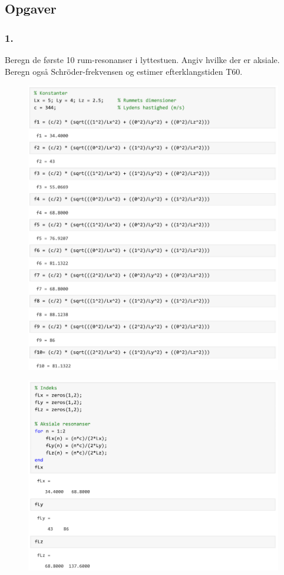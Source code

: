 \subsection{Opgaver}
\subsubsection{1.}
Beregn de første 10 rum-resonanser i lyttestuen. Angiv hvilke der er aksiale. Beregn også Schröder-frekvensen og estimer efterklangstiden T60.
\begin{figure} [H]
	\includegraphics[width=\linewidth]{graphics/32.png}
\end{figure}
\newpage
\begin{figure} [H]
	\includegraphics[width=\linewidth]{graphics/33.png}
\end{figure}
